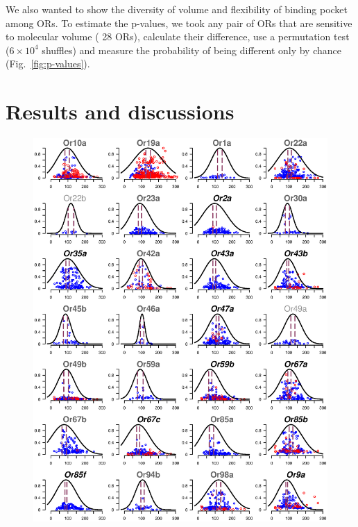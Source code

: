 \documentclass[fleqn,11pt]{wlscirep}
\newcommand{\numberofreceptors}{ 28 }
\begin{document}
We also wanted to show the diversity of volume and flexibility of binding pocket among ORs.
To estimate the p-values, 
we took any pair of ORs that are sensitive to molecular volume (\numberofreceptors ORs),
calculate their difference, 
use a permutation test ($6\times10^4$ shuffles) and measure the probability of being different only by chance (Fig.~\ref{fig:p-values}).


\section*{Results and discussions}
\begin{figure}
	\centering
		\includegraphics[width= \textwidth]{vol-res-}
		\label{fig:vol-res:all}		

\end{figure}
\end{document}
